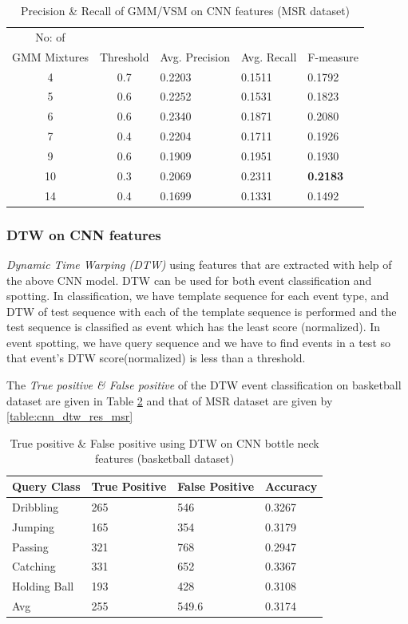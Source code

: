 \begin{table}[h]
\caption[Event spotting using GMM/VSM on CNN (on pre-processed input) features (MSR Action Dataset) ]{ Precision \& Recall  of GMM/VSM on CNN features (MSR dataset)}
\label{table:cnn_gmm_res_msr}
\centering
\begin{tabular}{|c|c|l|l|l|}
\hline
No: of &&&&\\
GMM Mixtures & Threshold & Avg. Precision & Avg. Recall & F-measure\\
\hline
\hline
 4 	&0.7 	&0.2203 	& 0.1511	&0.1792\\
 5 	&0.6 	&0.2252 	& 0.1531	&0.1823\\
 6 	&0.6 	&0.2340 	& 0.1871	&0.2080\\
 7 	&0.4 	&0.2204 	& 0.1711	&0.1926\\
 9 	&0.6 	&0.1909 	& 0.1951	&0.1930\\
10 	&0.3 	&0.2069 	& 0.2311	&\textbf{0.2183}\\
14 	&0.4 	&0.1699 	& 0.1331	&0.1492\\
\hline  
\end{tabular}
\end{table} 


\subsubsection{DTW on CNN features}
\textit{Dynamic Time Warping (DTW)} using features that are extracted with help of the above CNN model.  DTW can be used for both event classification and spotting.  In classification, we have template sequence for each event type, and DTW of test sequence with each of the template sequence is performed and the test sequence is classified as event which has the least score (normalized).  In event spotting, we have query sequence and we have to find events in a test so that event's DTW score(normalized) is less than a threshold.


The \textit{True positive \& False positive} of the DTW event classification on basketball dataset are given in Table \ref{table:cnn_dtw_res_basket} and that of MSR dataset are given by \ref{table:cnn_dtw_res_msr}

\begin{table}[ht]
\caption[Event classification using DTW on CNN features (OSUPEL basketball dataset) ]{True positive \& False positive using DTW on CNN bottle neck features (basketball dataset)}
\label{table:cnn_dtw_res_basket}
\centering
\begin{tabular}{|l|l|l|l|}
\hline
Query Class & True Positive & False Positive & Accuracy \\ \hline
Dribbling   &265  &546   &0.3267\\
Jumping     &165  &354   &0.3179\\
Passing     &321  &768   &0.2947\\
Catching    &331  &652   &0.3367\\
Holding Ball &193  &428   &0.3108\\
\hline
Avg         &255  &549.6 &0.3174\\
\hline  
\end{tabular}
\end{table} 

